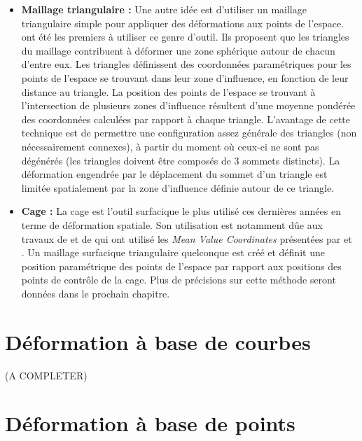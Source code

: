 \begin{itemize}
\item{\textbf{Maillage triangulaire :}} Une autre idée est d'utiliser un
maillage triangulaire simple pour appliquer des déformations aux points de
l'espace. \cite{KO03} ont été les premiers à utiliser ce genre d'outil. Ils
proposent que les triangles du maillage contribuent à déformer une zone
sphérique autour de chacun d'entre eux. Les triangles définissent des
coordonnées paramétriques pour les points de l'espace se trouvant dans leur
zone d'influence, en fonction de leur distance au triangle. La position des
points de l'espace se trouvant à l'intersection de plusieurs zones d'influence
résultent d'une moyenne pondérée des coordonnées calculées par rapport à
chaque triangle. L'avantage de cette technique est de permettre une
configuration assez générale des triangles (non nécessairement connexes), à
partir du moment où ceux-ci ne sont pas dégénérés (les triangles doivent être
composés de 3 sommets distincts). La déformation engendrée par le déplacement
du sommet d'un triangle est limitée spatialement par la zone d'influence
définie autour de ce triangle.

\item{\textbf{Cage :}} La cage est l'outil surfacique le plus utilisé ces
dernières années en terme de déformation spatiale. Son utilisation est
notamment dûe aux travaux de \cite{JSW05} et de \cite{FKR05} qui ont utilisé
les \textit{Mean Value Coordinates} présentées par \cite{Flo03} et \cite{FKR05}.
Un maillage surfacique triangulaire quelconque est créé et définit une
position paramétrique des points de l'espace par rapport aux positions des
points de contrôle de la cage. Plus de précisions sur cette méthode seront
données dans le prochain chapitre.

\end{itemize}

\section{Déformation à base de courbes} 

(A COMPLETER)

\section{Déformation à base de points}

